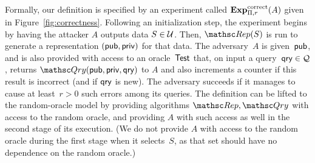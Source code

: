 Formally, our definition is specified by an experiment called $\mathrm{\mathbf{Exp}}^{\mathrm{correct}}_{\Pi,r}(A)$
given in Figure~\ref{fig:correctness}.
Following an initialization step,
the experiment begins by having the attacker $A$ outputs data $S \in {\cal U}$.
Then, $\Rep(S)$ is run to generate a representation $({\sf pub},{\sf priv})$ for that data.
The adversary~$A$ is given~${\sf pub}$, and is also
provided with access to an oracle~$\mathsf{Test}$ that, on input a query~$\mathsf{qry} \in {\cal Q}$,
returns $\Qry(\pubaux,\privaux,\qry)$ to $A$ and also increments
a counter if this result is incorrect (and if $\mathsf{qry}$ is new).  The adversary succeeds if it
manages to cause at least~$r>0$ such errors among its queries.
The definition can be lifted to the random-oracle model by providing
algorithms $\Rep,\Qry$ with access to the
random oracle, and providing $A$ with such access as well in the
second stage of its execution. (We do not provide $A$ with access to
the random oracle during the first stage when it selects~$S$, as that set
should have no dependence on the random oracle.) 




